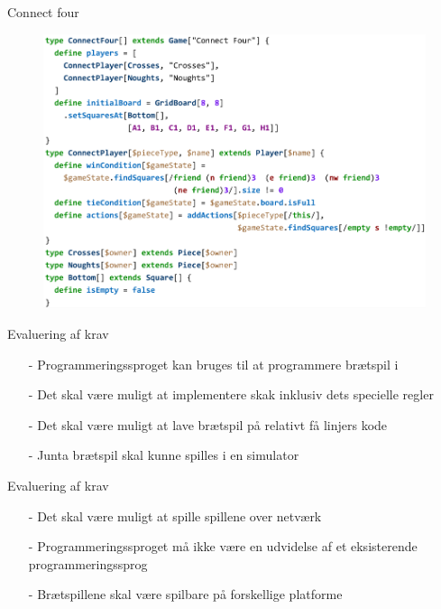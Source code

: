 \begin{frame}{Connect four}
 	\begin{figure}
    	\includegraphics[width=0.8\linewidth]{billeder/connect4_codeexample.png}
 	\end{figure}
\end{frame}

\begin{frame}{Evaluering af krav}
	\begin{itemize}
		\item[-] Programmeringssproget kan bruges til at programmere brætspil i
		\item[-] Det skal være muligt at implementere skak inklusiv dets specielle regler
		\item[-] Det skal være muligt at lave brætspil på relativt få linjers kode
		\item[-] Junta brætspil skal kunne spilles i en simulator
	\end{itemize}	
\end{frame}

\begin{frame}{Evaluering af krav}
	\begin{itemize}
		\item[-] Det skal være muligt at spille spillene over netværk
		\item[-] Programmeringssproget må ikke være en udvidelse af et eksisterende programmeringssprog 
		\item[-] Brætspillene skal være spilbare på forskellige platforme
	\end{itemize}	
\end{frame}

